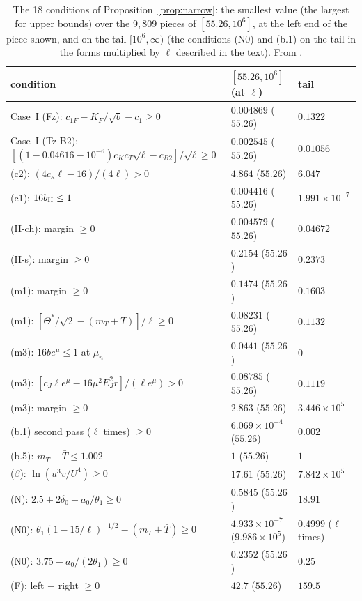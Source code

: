 \begin{table}
\caption{The 18 conditions of Proposition~\ref{prop:narrow}: the smallest value (the largest for upper bounds) over the $9{,}809$ pieces of $[55.26,10^6]$, at the left end of the piece shown, and on the tail $[10^6,\infty)$ (the conditions (N0) and (b.1) on the tail in the forms multiplied by $\ell$ described in the text). From .}
\label{tab:cond18}
\begin{ruledtabular}
\small
\begin{tabular}{p{}p{}p{}}
condition & $[55.26,10^6]$ (at $\ell$) & tail\\ \hline
Case~I (Fz): $c_{1F}-K_F/\sqrt b-c_1\ge0$ & $0.004869$ ($55.26$) & $0.1322$\\
Case~I (Tz-B2): $[(1-0.04616-10^{-6})c_Kc_T\sqrt\ell-c_{B2}]/\sqrt\ell\ge0$ & $0.002545$ ($55.26$) & $0.01056$\\
(c2): $(4c_\kappa\ell-16)/(4\ell)>0$ & $4.864$ ($55.26$) & $6.047$\\
(c1): $16b_{\rm II}\le1$ & $0.004416$ ($55.26$) & $1.991\times10^{-7}$\\
(II-ch): margin $\ge0$ & $0.004579$ ($55.26$) & $0.04672$\\
(II-s): margin $\ge0$ & $0.2154$ ($55.26$) & $0.2373$\\
(m1): margin $\ge0$ & $0.1474$ ($55.26$) & $0.1603$\\
(m1): $[\Theta^*/\sqrt2-(m_T+T)]/\ell\ge0$ & $0.08231$ ($55.26$) & $0.1132$\\
(m3): $16be^\mu\le1$ at $\mu_n$ & $0.0441$ ($55.26$) & $0$\\
(m3): $[c_J\ell e^\mu-16\mu^2E_J^2r]/(\ell e^\mu)>0$ & $0.08785$ ($55.26$) & $0.1119$\\
(m3): margin $\ge0$ & $2.863$ ($55.26$) & $3.446\times10^{5}$\\
(b.1) second pass ($\ell$ times) $\ge0$ & $6.069\times10^{-4}$ ($55.26$) & $0.002$\\
(b.5): $m_T+\bar T\le1.002$ & $1$ ($55.26$) & $1$\\
($\beta$): $\ln(u^3v/U^4)\ge0$ & $17.61$ ($55.26$) & $7.842\times10^{5}$\\
(N): $2.5+2\delta_0-a_0/\theta_1\ge0$ & $0.5845$ ($55.26$) & $18.91$\\
(N0): $\theta_1(1-15/\ell)^{-1/2}-(m_T+\bar T)\ge0$ & $4.933\times10^{-7}$ ($9.986\times10^{5}$) & $0.4999$ ($\ell$ times)\\
(N0): $3.75-a_0/(2\theta_1)\ge0$ & $0.2352$ ($55.26$) & $0.25$\\
(F): left $-$ right $\ge0$ & $42.7$ ($55.26$) & $159.5$\\
\end{tabular}
\end{ruledtabular}
\end{table}
